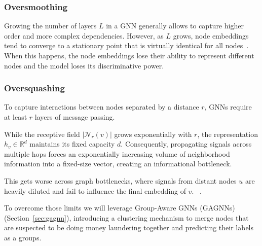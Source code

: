 \subsubsection{Oversmoothing}
Growing the number of layers \(L\) in a GNN generally allows to capture higher order and more complex dependencies. However, as \(L\) grows, node embeddings tend to converge to a stationary point that is virtually identical for all nodes~\cite{Cheng_2025}.
When this happens, the node embeddings lose their ability to represent different nodes and the model loses its discriminative power.

\subsubsection{Oversquashing}
To capture interactions between nodes separated by a distance $r$, GNNs require at least $r$ layers of message passing. 

While the receptive field $\vert{}\mathcal{N}_r(v)\vert{}$ grows exponentially with $r$, the representation $h_v \in \mathbb{R}^d$ maintains its fixed capacity $d$. Consequently, propagating signals across multiple hops forces an exponentially increasing volume of neighborhood information into a fixed-size vector, creating an informational bottleneck.

This gets worse across graph bottlenecks, where signals from distant nodes $u$ are heavily diluted and fail to influence the final embedding of $v$.
~\cite{Cheng_2025}.
\bigskip

To overcome those limits we will leverage Group-Aware GNNs (GAGNNs) \cite{mainpaper} (Section~\ref{sec:gagnn}), introducing a clustering mechanism to merge nodes that are suspected to be doing money laundering together and predicting their labels as a groups.


